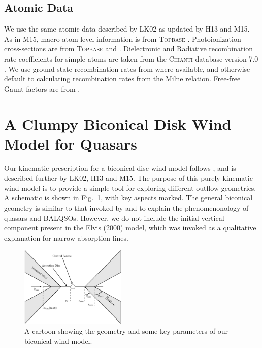 \documentclass[useAMS,usenatbib]{mn2e_x}
\begin{document}
\subsection{Atomic Data}
We use the same atomic data  described by LK02 as updated by H13 and M15.
As in M15, macro-atom level information is from \textsc{Topbase} \citep{cunto1993}.
Photoionization cross-sections are from \textsc{Topbase} \citep{cunto1993} and \cite{vfky}.
Dielectronic and Radiative recombination rate coefficients for simple-atoms are taken from 
the \textsc{Chianti} database version 7.0 \citep{dere1997,landi2012}.
We use ground state recombination rates from \cite{badnell2006} where available,
and otherwise default to calculating recombination rates from the Milne
relation. Free-free Gaunt factors are from \cite{sutherland1998}.


%
%

\section{A Clumpy Biconical Disk Wind Model for Quasars}

Our kinematic prescription for a biconical disc wind model
follows \cite{SV93}, and is described further by
LK02, H13 and M15. The purpose of this
purely kinematic wind model is to provide a simple tool for 
exploring different outflow geometries.
A schematic is shown in Fig.~\ref{fig:cartoon},
with key aspects marked. The general biconical
geometry is similar to that invoked by \cite{MCGV95} and 
\cite{elvis2000} to explain the phenomenonology
of quasars and BALQSOs. However, we do not include the initial
vertical component present in the Elvis (2000) model, which was
invoked as a qualitative explanation for narrow absorption lines.

\begin{figure} 
\centering
\includegraphics[width=0.45\textwidth]{figures/fig1.eps}
\caption
{
A cartoon showing the geometry and some key parameters of
our biconical wind model.
}
\label{fig:cartoon}
\end{figure} 
\end{document}
